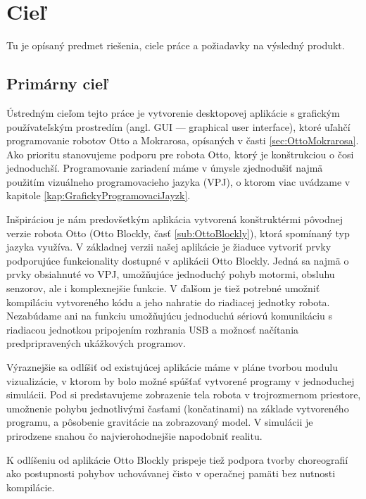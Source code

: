 \chapter{Cieľ}

\label{kap:ciel}

Tu je opísaný predmet riešenia, ciele práce a požiadavky na výsledný produkt.

\section{Primárny cieľ}
Ústredným cieľom tejto práce je vytvorenie desktopovej aplikácie s grafickým používateľským prostredím (angl. GUI --- graphical user interface), ktoré uľahčí programovanie robotov Otto a Mokrarosa, opísaných v časti \ref{sec:OttoMokrarosa}. Ako prioritu stanovujeme podporu pre robota Otto, ktorý je konštrukciou o čosi jednoduchší. Programovanie zariadení máme v úmysle zjednodušiť najmä použitím vizuálneho programovacieho jazyka (VPJ), o ktorom viac uvádzame v kapitole \ref{kap:GrafickyProgramovaciJayzk}.

Inšpiráciou je nám predovšetkým aplikácia vytvorená konštruktérmi pôvodnej verzie robota Otto (Otto Blockly, časť \ref{sub:OttoBlockly}), ktorá spomínaný typ jazyka využíva. V základnej verzii našej aplikácie je žiaduce vytvoriť prvky podporujúce funkcionality dostupné v aplikácii Otto Blockly. Jedná sa najmä o prvky obsiahnuté vo VPJ, umožňujúce jednoduchý pohyb motormi, obsluhu senzorov, ale i komplexnejšie funkcie. V ďalšom je tiež potrebné umožniť kompiláciu vytvoreného kódu a jeho nahratie do riadiacej jednotky robota. Nezabúdame ani na funkciu umožňujúcu jednoduchú sériovú komunikáciu s riadiacou jednotkou pripojením rozhrania USB a možnosť načítania predpripravených ukážkových programov.

Výraznejšie sa odlíšiť od existujúcej aplikácie máme v pláne tvorbou modulu vizualizácie, v ktorom by bolo možné spúšťať vytvorené programy v jednoduchej simulácii. Pod  si predstavujeme zobrazenie tela robota v trojrozmernom priestore, umožnenie pohybu jednotlivými časťami (končatinami) na základe vytvoreného programu, a pôsobenie gravitácie na zobrazovaný model. V simulácii je prirodzene snahou čo najvierohodnejšie napodobniť realitu.

K odlíšeniu od aplikácie Otto Blockly prispeje tiež podpora tvorby choreografií ako postupnosti pohybov uchovávanej čisto v operačnej pamäti bez nutnosti kompilácie.

